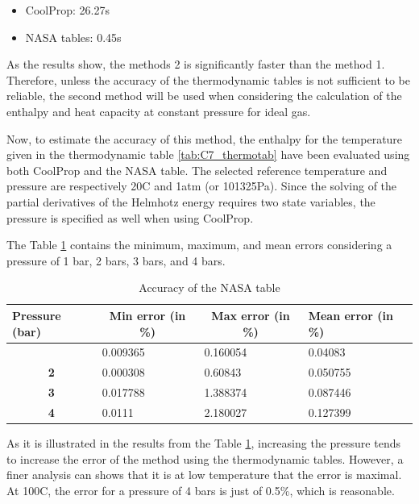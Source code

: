 \begin{itemize}
    \item CoolProp: 26.27s
    \item NASA tables: 0.45s
\end{itemize}

As the results show, the methods 2 is significantly faster than the method 1. Therefore, unless the accuracy of the thermodynamic tables is not sufficient to be reliable, the second method will be used when considering the calculation of the enthalpy and heat capacity at constant pressure for ideal gas.

Now, to estimate the accuracy of this method, the enthalpy for the temperature given in the thermodynamic table \ref{tab:C7_thermotab} have been evaluated using both CoolProp and the NASA table. The selected reference temperature and pressure are respectively 20\degree C and 1atm (or 101325Pa). Since the solving of the partial derivatives of the Helmhotz energy requires two state variables, the pressure is specified as well when using CoolProp. 

The Table \ref{tab:C7_acc_table} contains the minimum, maximum, and mean errors considering a pressure of 1 bar, 2 bars, 3 bars, and 4 bars.
\begin{longtable}[c]{@{}clll@{}}
\caption{Accuracy of the NASA table }
\label{tab:C7_acc_table}\\
\toprule
\multicolumn{1}{l}{\textbf{Pressure (bar)}} & \multicolumn{1}{c}{\textbf{Min error (in \%)}} & \multicolumn{1}{c}{\textbf{Max error (in \%)}} & \textbf{Mean error (in \%)} \\* \midrule
\endfirsthead
%
\endhead
%
\bottomrule
\endfoot
%
\endlastfoot
%
\multicolumn{1}{c}{\textbf{1}}                                  & 0.009365                                       & 0.160054                                       & 0.04083                     \\
\multicolumn{1}{c}{\textbf{2}}                                  & 0.000308                                       & 0.60843                                        & 0.050755                    \\
\multicolumn{1}{c}{\textbf{3}}                                  & 0.017788                                       & 1.388374                                       & 0.087446                    \\
\multicolumn{1}{c}{\textbf{4}}                                  & 0.0111                                         & 2.180027                                       & 0.127399                    \\* \bottomrule
\end{longtable}
As it is illustrated in the results from the Table \ref{tab:C7_acc_table}, increasing the pressure tends to increase the error of the method using the thermodynamic tables. However, a finer analysis can shows that it is at low temperature that the error is maximal. At 100\degree C, the error for a pressure of 4 bars is just of 0.5\%, which is reasonable. 


